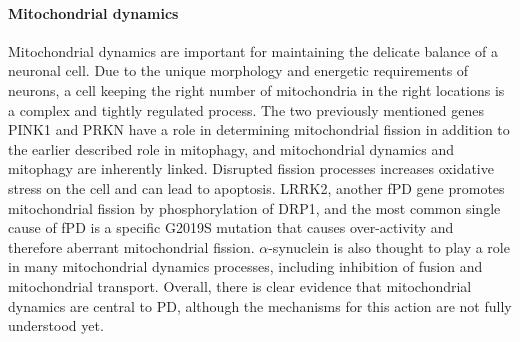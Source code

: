 \documentclass{article}
\begin{document}
\paragraph{Mitochondrial dynamics}Mitochondrial dynamics are important for maintaining the delicate balance of a neuronal cell\cite{Chen2009MitochondrialDiseases}. Due to the unique morphology and energetic requirements of neurons, a cell keeping the right number of mitochondria in the right locations is a complex and tightly regulated process. The two previously mentioned genes PINK1 and PRKN have a role in determining mitochondrial fission in addition to the earlier described role in mitophagy, and mitochondrial dynamics and mitophagy are inherently linked\cite{Archer2013MitochondrialDiseases}. Disrupted fission processes increases oxidative stress on the cell and can lead to apoptosis. LRRK2, another fPD gene promotes mitochondrial fission by phosphorylation of DRP1, and the most common single cause of fPD is a specific G2019S mutation that causes over-activity and therefore aberrant mitochondrial fission\cite{Su2013InhibitionMutation}. $\alpha$-synuclein is also thought to play a role in many mitochondrial dynamics processes, including inhibition of fusion and mitochondrial transport\cite{Valdinocci2019IntracellularDisease}. Overall, there is clear evidence that mitochondrial dynamics are central to PD, although the mechanisms for this action are not fully understood yet.
\end{document}
